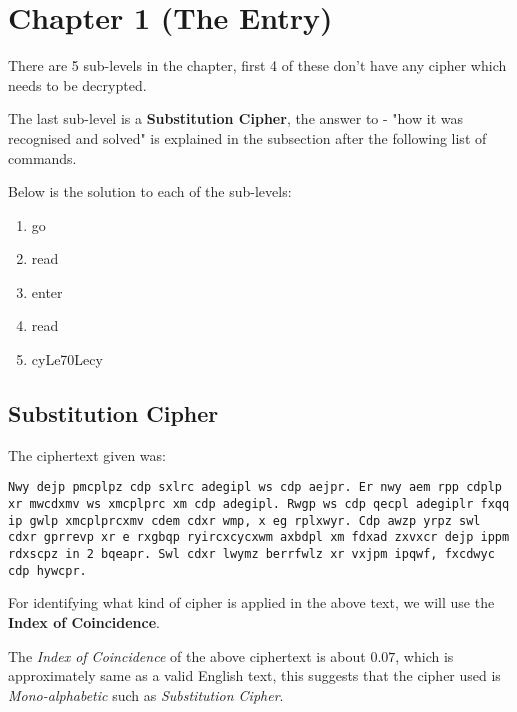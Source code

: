 \documentclass[10pt,twoside]{article}
\begin{document}


\section{Chapter 1 (The Entry)}

There are 5 sub-levels in the chapter, first 4 of these don't have any cipher which needs to be decrypted. \newline

The last sub-level is a \textbf{Substitution Cipher}, the answer to - "how it was recognised and solved" is explained in the subsection after the following list of commands. \newline

Below is the solution to each of the sub-levels:
\begin{enumerate}
  \setlength\itemsep{0em}
  \item go
  \item read
  \item enter
  \item read
  \item cyLe70Lecy
\end{enumerate}

\subsection{Substitution Cipher}

The ciphertext given was: \newline

\texttt{Nwy dejp pmcplpz cdp sxlrc adegipl ws cdp aejpr. Er nwy aem rpp cdplp xr mwcdxmv ws xmcplprc xm cdp adegipl. Rwgp ws cdp qecpl adegiplr fxqq ip gwlp xmcplprcxmv cdem cdxr wmp, x eg rplxwyr. Cdp awzp yrpz swl cdxr gprrevp xr e rxgbqp ryircxcycxwm axbdpl xm fdxad zxvxcr dejp ippm rdxscpz in 2 bqeapr. Swl cdxr lwymz berrfwlz xr vxjpm ipqwf, fxcdwyc cdp hywcpr.} \newline

For identifying what kind of cipher is applied in the above text, we will use the \textbf{Index of Coincidence}. \newline

The \textit{Index of Coincidence} of the above ciphertext is about $0.07$, which is approximately same as a valid English text, this suggests that the cipher used is \textit{Mono-alphabetic} such as \textit{Substitution Cipher}.
\end{document}

